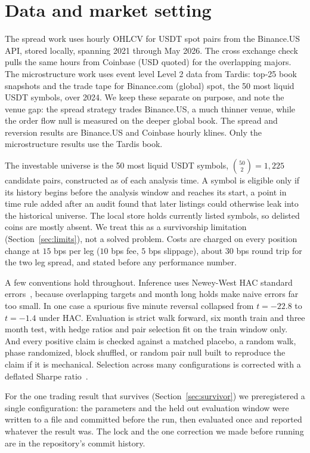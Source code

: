 \documentclass[11pt]{article}
\begin{document}
\section{Data and market setting}
\label{sec:methods}

The spread work uses hourly OHLCV for USDT spot pairs from the Binance.US API, stored locally,
spanning 2021 through May 2026. The cross exchange check pulls the same hours from Coinbase
(USD quoted) for the overlapping majors. The microstructure work uses event level Level 2 data
from Tardis: top-25 book snapshots and the trade tape for Binance.com (global) spot, the 50 most liquid USDT
symbols, over 2024. We keep these separate on purpose, and note the venue gap: the spread strategy trades Binance.US, a
much thinner venue, while the order flow null is measured on the deeper global book. The spread and
reversion results are Binance.US and Coinbase hourly klines. Only the microstructure results use
the Tardis book.

The investable universe is the 50 most liquid USDT symbols, $\binom{50}{2}=1{,}225$ candidate
pairs, constructed as of each analysis time. A
symbol is eligible only if its history begins before the analysis window and reaches its start, a
point in time rule added after an audit found that later listings could otherwise leak into the
historical universe. The local store holds currently listed symbols, so delisted coins are mostly
absent. We treat this as a survivorship limitation (Section~\ref{sec:limits}), not a solved
problem. Costs are charged on every position change at $15$ bps per leg ($10$ bps fee, $5$ bps
slippage), about $30$ bps round trip for the two leg spread, and stated before any performance
number.

A few conventions hold throughout. Inference uses Newey-West HAC standard
errors~\cite{newey1987hac}, because overlapping
targets and month long holds make naive errors far too small. In one case a spurious five minute
reversal collapsed from $t = -22.8$ to $t = -1.4$ under HAC. Evaluation is strict walk forward,
six month train and three month test, with hedge ratios and pair selection fit on the train
window only. And every positive claim is checked against a matched placebo, a random walk,
phase randomized, block shuffled, or random pair null built to reproduce the claim if it is
mechanical. Selection across many configurations is corrected with a deflated Sharpe
ratio~\cite{bailey2014dsr}.

For the one trading result that survives (Section~\ref{sec:survivor}) we preregistered a single
configuration: the parameters and the held out evaluation window were written to a file and
committed before the run, then evaluated once and reported whatever the result was. The lock and
the one correction we made before running are in the repository's commit history.
\end{document}
